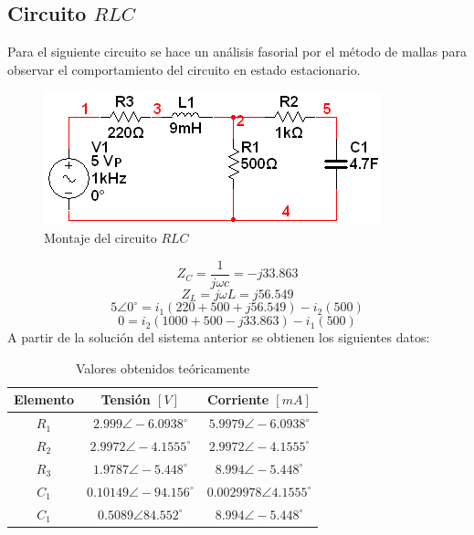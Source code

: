 \documentclass[twocolumn]{IEEEtran}
\begin{document}
\subsection{Circuito $RLC$}
\noindent
Para el siguiente circuito se hace un análisis fasorial por el método de mallas para observar el comportamiento del circuito en estado estacionario.
\begin{figure}[H]
	\centering
		\includegraphics[scale=0.75]{circ3.png}
	\caption{Montaje del circuito $RLC$}
	\label{fig8}
\end{figure}
\begin{equation}
 Z_C = \frac{1}{{j\omega c}} =  - j33.863
\label{ecu30}
\end{equation}
\begin{equation}
 {Z_L} = j\omega L = j56.549
\label{ecu31}
\end{equation}
\begin{equation}
 5\angle 0^\circ  = {i_1}(220 + 500 + j56.549) - {i_2}(500)
\label{ecu32}
\end{equation}
\begin{equation}
 0=i_2 (1000+500-j33.863)-i_1 (500)
\label{ecu33}
\end{equation}
\noindent
A partir de la solución del sistema anterior se obtienen los siguientes datos:
\begin{table}[H]
	\centering
\begin{tabular}[c]{|c|c|c|} \hline
Elemento & Tensión $[V]$ & Corriente $[mA]$ \\ \hline
$R_1$ & $2.999 \angle -6.0938 ^\circ$ & $5.9979 \angle -6.0938^\circ$ \\ \hline
$R_2$ & $2.9972 \angle -4.1555^\circ$ & $2.9972 \angle -4.1555^\circ$ \\ \hline
$R_3$ & $1.9787 \angle -5.448^\circ$ & $8.994 \angle -5.448^\circ$ \\ \hline
$C_1$ & $0.10149 \angle -94.156^\circ$ & $0.0029978 \angle 4.1555^\circ$ \\ \hline
$C_1$ & $0.5089 \angle 84.552^\circ$ & $8.994 \angle -5.448^\circ$ \\ \hline
\end{tabular}
	\caption{Valores obtenidos teóricamente}
	\label{tab5}
\end{table}
\end{document}
